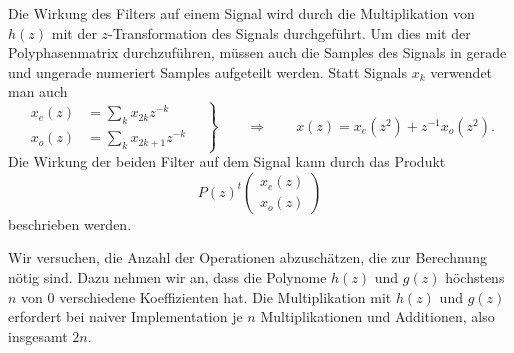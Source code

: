 Die Wirkung des Filters auf einem Signal wird durch die Multiplikation
von $h(z)$ mit der $z$-Transformation des Signals durchgeführt.
Um dies mit der Polyphasenmatrix durchzuführen, müssen auch die Samples
des Signals in gerade und ungerade numeriert Samples aufgeteilt werden.
Statt Signals $x_k$ verwendet man auch
\[
\left.
\begin{aligned}
x_e(z) &= \sum_k x_{2k}z^{-k} \\
x_o(z) &= \sum_k x_{2k+1}z^{-k}
\end{aligned}
\quad\right\}
\qquad
\Rightarrow
\qquad
x(z) = x_e(z^2) + z^{-1} x_o(z^2).
\]
Die Wirkung der beiden Filter auf dem Signal kann durch das Produkt
\[
P(z)^t \begin{pmatrix} x_e(z)\\ x_o(z) \end{pmatrix}
\]
beschrieben werden.

Wir versuchen, die Anzahl der Operationen abzuschätzen, die zur
Berechnung nötig sind.
Dazu nehmen wir an, dass die Polynome $h(z)$ und $g(z)$ höchstens $n$
von $0$ verschiedene Koeffizienten hat.
Die Multiplikation mit $h(z)$ und $g(z)$ erfordert bei naiver 
Implementation je $n$ Multiplikationen und Additionen, also
insgesamt $2n$.

